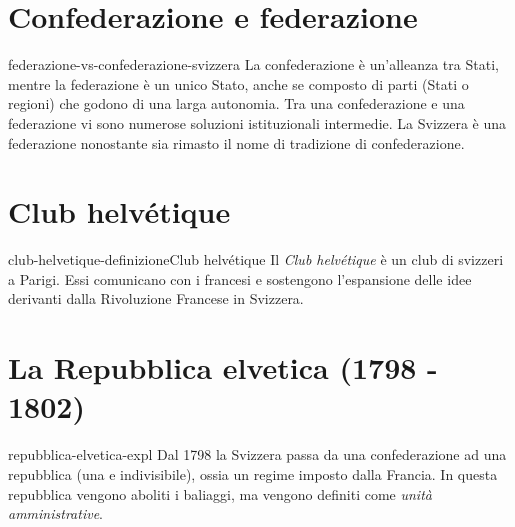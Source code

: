 \documentclass[preview]{standalone}
\begin{document}
\section{Confederazione e federazione}

\begin{snippet}{federazione-vs-confederazione-svizzera}
    La confederazione è un'alleanza tra Stati, mentre la federazione è un unico Stato,
    anche se composto di parti (Stati o regioni) che godono di una larga autonomia.
    Tra una confederazione e una federazione vi sono numerose soluzioni istituzionali intermedie.
    La Svizzera è una federazione nonostante sia rimasto il nome di tradizione di confederazione.
\end{snippet}

\section{Club helvétique}

\begin{snippetdefinition}{club-helvetique-definizione}{Club helvétique}
    Il \textit{Club helvétique} è un club di svizzeri a Parigi.
    Essi comunicano con i francesi e sostengono l'espansione delle idee derivanti dalla Rivoluzione Francese
    in Svizzera.
\end{snippetdefinition}

\section{La Repubblica elvetica (1798 - 1802)}

\begin{snippet}{repubblica-elvetica-expl}
    Dal 1798 la Svizzera passa da una confederazione ad una repubblica (una e indivisibile),
    ossia un regime imposto dalla Francia.
    In questa repubblica vengono aboliti i baliaggi, ma vengono definiti come \textit{unità amministrative}.
\end{snippet}

\end{document}
